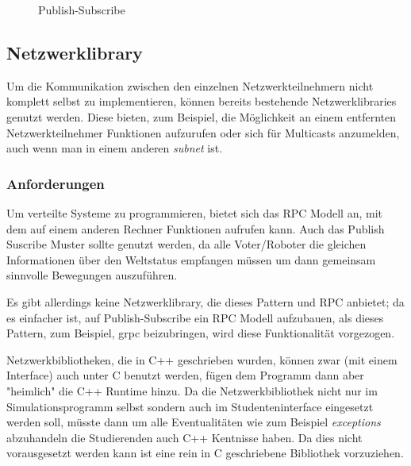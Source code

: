 \begin{figure}
	\centering
	\caption{Publish-Subscribe}
	\label{fig:pubsub}
\end{figure}

\subsection{Netzwerklibrary}
Um die Kommunikation zwischen den einzelnen Netzwerkteilnehmern nicht komplett selbst zu implementieren, k{\"{o}}nnen bereits bestehende Netzwerklibraries genutzt werden.
Diese bieten, zum Beispiel, die M{\"{o}}glichkeit an einem entfernten Netzwerkteilnehmer Funktionen aufzurufen oder sich f{\"{u}}r Multicasts anzumelden, auch wenn man in einem anderen
\textit{subnet} ist.

\subsubsection{Anforderungen}
Um verteilte Systeme zu programmieren, bietet sich das RPC Modell an, mit dem auf einem anderen Rechner Funktionen 
aufrufen kann. Auch das Publish Suscribe Muster sollte genutzt werden, da alle Voter/Roboter die gleichen
Informationen {\"{u}}ber den Weltstatus empfangen m{\"{u}}ssen um dann gemeinsam sinnvolle Bewegungen
auszuf{\"{u}}hren.

Es gibt allerdings keine Netzwerklibrary, die dieses Pattern und RPC anbietet; da es einfacher ist, auf Publish-Subscribe ein RPC Modell aufzubauen, als dieses Pattern, zum Beispiel, grpc beizubringen, wird
diese Funktionalit{\"{a}}t vorgezogen.

Netzwerkbibliotheken, die in C++ geschrieben wurden, k{\"{o}}nnen zwar (mit einem Interface) auch unter C benutzt 
werden, f{\"{u}}gen dem Programm dann aber "heimlich" die C++ Runtime hinzu. Da die Netzwerkbibliothek nicht
nur im Simulationsprogramm selbst sondern auch im Studenteninterface eingesetzt werden soll, m{\"{u}}sste dann
um alle Eventualit{\"{a}}ten wie zum Beispiel \textit{exceptions} abzuhandeln die Studierenden auch C++
Kentnisse haben. Da dies nicht vorausgesetzt werden kann ist eine rein in C geschriebene Bibliothek vorzuziehen.

